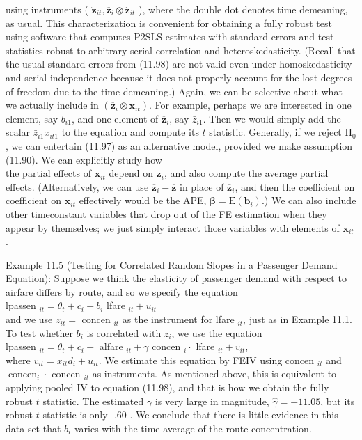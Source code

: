 \documentclass[10pt]{article}
\begin{document}
using instruments ( $\ddot{\mathbf{z}}_{i t}, \overline{\mathbf{z}}_{i} \otimes \ddot{\mathbf{z}}_{i t}$ ), where the double dot denotes time demeaning, as usual. This characterization is convenient for obtaining a fully robust test using software that computes P2SLS estimates with standard errors and test statistics robust to arbitrary serial correlation and heteroskedasticity. (Recall that the usual standard errors from (11.98) are not valid even under homoskedasticity and serial independence because it does not properly account for the lost degrees of freedom due to the time demeaning.) Again, we can be selective about what we actually include in $\left(\overline{\mathbf{z}}_{i} \otimes \mathbf{x}_{i t}\right)$. For example, perhaps we are interested in one element, say $b_{i 1}$, and one element of $\overline{\mathbf{z}}_{i}$, say $\bar{z}_{i 1}$. Then we would simply add the scalar $\bar{z}_{i 1} x_{i t 1}$ to the equation and compute its $t$ statistic. Generally, if we reject $\mathrm{H}_{0}$, we can entertain (11.97) as an alternative model, provided we make assumption (11.90). We can explicitly study how\\
the partial effects of $\mathbf{x}_{i t}$ depend on $\overline{\mathbf{z}}_{i}$, and also compute the average partial effects. (Alternatively, we can use $\overline{\mathbf{z}}_{i}-\overline{\mathbf{z}}$ in place of $\overline{\mathbf{z}}_{i}$, and then the coefficient on coefficient on $\mathbf{x}_{i t}$ effectively would be the APE, $\boldsymbol{\beta}=\mathrm{E}\left(\mathbf{b}_{i}\right)$.) We can also include other timeconstant variables that drop out of the FE estimation when they appear by themselves; we just simply interact those variables with elements of $\mathbf{x}_{i t}$.

Example 11.5 (Testing for Correlated Random Slopes in a Passenger Demand Equation): Suppose we think the elasticity of passenger demand with respect to airfare differs by route, and so we specify the equation\\
lpassen $_{i t}=\theta_{t}+c_{i}+b_{i}$ lfare $_{i t}+u_{i t}$\\
and we use $z_{i t}=$ concen $_{i t}$ as the instrument for lfare ${ }_{i t}$, just as in Example 11.1. To test whether $b_{i}$ is correlated with $\bar{z}_{i}$, we use the equation\\
lpassen $_{i t}=\theta_{t}+c_{i}+$ alfare $_{i t}+\gamma \overline{\text { concen }}_{i} \cdot$ lfare $_{i t}+v_{i t}$,\\
where $v_{i t}=x_{i t} d_{i}+u_{i t}$. We estimate this equation by FEIV using concen ${ }_{i t}$ and $\overline{\operatorname{concen}}_{i} \cdot$ concen $_{i t}$ as instruments. As mentioned above, this is equivalent to applying pooled IV to equation (11.98), and that is how we obtain the fully robust $t$ statistic. The estimated $\gamma$ is very large in magnitude, $\hat{\gamma}=-11.05$, but its robust $t$ statistic is only -.60 . We conclude that there is little evidence in this data set that $b_{i}$ varies with the time average of the route concentration.
\end{document}
